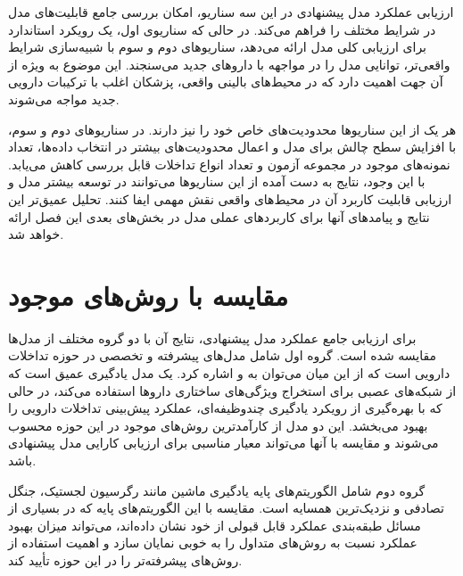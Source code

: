 ارزیابی عملکرد مدل پیشنهادی در این سه سناریو، امکان بررسی جامع قابلیت‌های مدل در شرایط مختلف را فراهم می‌کند. در حالی که سناریوی اول، یک رویکرد استاندارد برای ارزیابی کلی مدل ارائه می‌دهد، سناریوهای دوم و سوم با شبیه‌سازی شرایط واقعی‌تر، توانایی مدل را در مواجهه با داروهای جدید می‌سنجند. این موضوع به ویژه از آن جهت اهمیت دارد که در محیط‌های بالینی واقعی، پزشکان اغلب با ترکیبات دارویی جدید مواجه می‌شوند.

هر یک از این سناریوها محدودیت‌های خاص خود را نیز دارند. در سناریوهای دوم و سوم، با افزایش سطح چالش برای مدل و اعمال محدودیت‌های بیشتر در انتخاب داده‌ها، تعداد نمونه‌های موجود در مجموعه آزمون و تعداد انواع تداخلات قابل بررسی کاهش می‌یابد. با این وجود، نتایج به دست آمده از این سناریوها می‌توانند در توسعه بیشتر مدل و ارزیابی قابلیت کاربرد آن در محیط‌های واقعی نقش مهمی ایفا کنند. تحلیل عمیق‌تر این نتایج و پیامدهای آنها برای کاربردهای عملی مدل در بخش‌های بعدی این فصل ارائه خواهد شد.

\section{مقایسه با روش‌های موجود}

برای ارزیابی جامع عملکرد مدل پیشنهادی، نتایج آن با دو گروه مختلف از مدل‌ها مقایسه شده است. گروه اول شامل مدل‌های پیشرفته و تخصصی در حوزه تداخلات دارویی است که از این میان می‌توان به  \cite{ref_ryu2018} و  \cite{ref_deng2020} اشاره کرد.  یک مدل یادگیری عمیق است که از شبکه‌های عصبی برای استخراج ویژگی‌های ساختاری داروها استفاده می‌کند، در حالی که  با بهره‌گیری از رویکرد یادگیری چندوظیفه‌ای، عملکرد پیش‌بینی تداخلات دارویی را بهبود می‌بخشد. این دو مدل از کارآمدترین روش‌های موجود در این حوزه محسوب می‌شوند و مقایسه با آنها می‌تواند معیار مناسبی برای ارزیابی کارایی مدل پیشنهادی باشد.

گروه دوم شامل الگوریتم‌های پایه یادگیری ماشین مانند رگرسیون لجستیک، جنگل تصادفی و نزدیک‌ترین همسایه است. مقایسه با این الگوریتم‌های پایه که در بسیاری از مسائل طبقه‌بندی عملکرد قابل قبولی از خود نشان داده‌اند، می‌تواند میزان بهبود عملکرد نسبت به روش‌های متداول را به خوبی نمایان سازد و اهمیت استفاده از روش‌های پیشرفته‌تر را در این حوزه تأیید کند.

